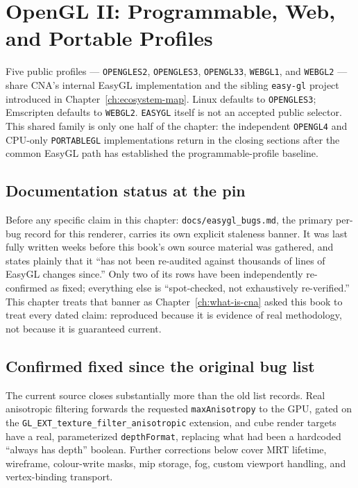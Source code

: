 \chapter{OpenGL II: Programmable, Web, and Portable Profiles}
\label{ch:opengl-programmable}
\label{ch:easygl-backend}

Five public profiles --- \texttt{OPENGLES2}, \texttt{OPENGLES3}, \texttt{OPENGL33},
\texttt{WEBGL1}, and \texttt{WEBGL2} --- share CNA's internal EasyGL implementation and the
sibling \texttt{easy-gl} project introduced in Chapter~\ref{ch:ecosystem-map}. Linux defaults
to \texttt{OPENGLES3}; Emscripten defaults to \texttt{WEBGL2}. \texttt{EASYGL} itself is not
an accepted public selector.  This shared family is only one half of the chapter: the
independent \texttt{OPENGL4} and CPU-only \texttt{PORTABLEGL} implementations return in the
closing sections after the common EasyGL path has established the programmable-profile
baseline.

\section{Documentation status at the pin}

Before any specific claim in this chapter: \texttt{docs/easygl\_bugs.md}, the primary
per-bug record for this renderer, carries its own explicit staleness banner. It was last
fully written weeks before this book's own source material was gathered, and states plainly
that it ``has not been re-audited against thousands of lines of EasyGL changes since.'' Only
two of its rows have been independently re-confirmed as fixed; everything else is
``spot-checked, not exhaustively re-verified.'' This chapter treats that banner as
Chapter~\ref{ch:what-is-cna} asked this book to treat every dated claim: reproduced because
it is evidence of real methodology, not because it is guaranteed current.

\section{Confirmed fixed since the original bug list}

The current source closes substantially more than the old list records. Real anisotropic
filtering forwards the requested \texttt{maxAnisotropy} to the GPU, gated on the
\texttt{GL\_EXT\_texture\_filter\_anisotropic} extension, and cube render targets have a real,
parameterized \texttt{depthFormat}, replacing what had been a hardcoded
``always has depth'' boolean. Further corrections below cover MRT lifetime, wireframe,
colour-write masks, mip storage, fog, custom viewport handling, and vertex-binding transport.

